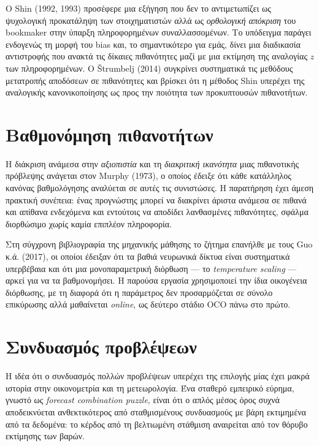 \documentclass[12pt,a4paper,oneside]{report}
\renewcommand{\_}{\oldunderscore\allowbreak}
\theoremstyle{definition}
\theoremstyle{plain}
\theoremstyle{remark}
\begin{document}
Ο Shin (1992, 1993) προσέφερε μια εξήγηση που δεν το αντιμετωπίζει ως ψυχολογική
προκατάληψη των στοιχηματιστών αλλά ως \emph{ορθολογική απόκριση} του bookmaker στην ύπαρξη
πληροφορημένων συναλλασσομένων. Το υπόδειγμα παράγει ενδογενώς τη μορφή του bias και, το
σημαντικότερο για εμάς, δίνει μια διαδικασία αντιστροφής που ανακτά τις δίκαιες πιθανότητες
μαζί με μια εκτίμηση της αναλογίας $z$ των πληροφορημένων. Ο Štrumbelj (2014) συγκρίνει
συστηματικά τις μεθόδους μετατροπής αποδόσεων σε πιθανότητες και βρίσκει ότι η μέθοδος Shin
υπερέχει της αναλογικής κανονικοποίησης ως προς την ποιότητα των προκυπτουσών πιθανοτήτων.

\section{Βαθμονόμηση πιθανοτήτων}

Η διάκριση ανάμεσα στην \emph{αξιοπιστία} και τη \emph{διακριτική ικανότητα} μιας
πιθανοτικής πρόβλεψης ανάγεται στον Murphy (1973), ο οποίος έδειξε ότι κάθε κατάλληλος
κανόνας βαθμολόγησης αναλύεται σε αυτές τις συνιστώσες. Η παρατήρηση έχει άμεση πρακτική
συνέπεια: ένας προγνώστης μπορεί να διακρίνει άριστα ανάμεσα σε πιθανά και απίθανα
ενδεχόμενα και εντούτοις να αποδίδει λανθασμένες πιθανότητες, σφάλμα διορθώσιμο χωρίς καμία
επιπλέον πληροφορία.

Στη σύγχρονη βιβλιογραφία της μηχανικής μάθησης το ζήτημα επανήλθε με τους Guo κ.ά. (2017),
οι οποίοι έδειξαν ότι τα βαθιά νευρωνικά δίκτυα είναι συστηματικά υπερβέβαια και ότι μια
μονοπαραμετρική διόρθωση --- το \emph{temperature scaling} --- αρκεί για να τα
βαθμονομήσει. Η παρούσα εργασία χρησιμοποιεί την ίδια οικογένεια διόρθωσης, με τη διαφορά
ότι η παράμετρος δεν προσαρμόζεται σε σύνολο επικύρωσης αλλά μαθαίνεται \emph{online},
ως δεύτερο στάδιο OCO πάνω στο πρώτο.

\section{Συνδυασμός προβλέψεων}

Η ιδέα ότι ο συνδυασμός πολλών προβλέψεων υπερέχει της επιλογής μίας έχει μακρά ιστορία στην
οικονομετρία και τη μετεωρολογία. Ένα σταθερό εμπειρικό εύρημα, γνωστό ως
\emph{forecast combination puzzle}, είναι ότι ο απλός μέσος όρος συχνά αποδεικνύεται
ανθεκτικότερος από σταθμισμένους συνδυασμούς με βάρη εκτιμημένα από τα δεδομένα: το κέρδος
από τη βελτιωμένη στάθμιση αναιρείται από τον θόρυβο εκτίμησης των βαρών.
\end{document}

